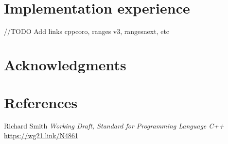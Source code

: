 \documentclass{wg21}
\begin{document}
\section{Implementation experience}

//TODO Add links cppcoro, ranges v3, rangesnext, etc


\section{Acknowledgments}


\section{References}
\renewcommand{\section}[2]{}%



\begin{thebibliography}{9}

    Richard Smith
    \emph{Working Draft, Standard for Programming Language C++}\newline
    \url{https://wg21.link/N4861}

\end{thebibliography}
\end{document}
